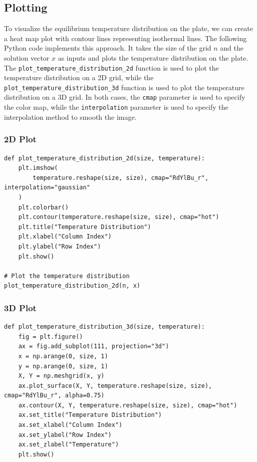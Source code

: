 \documentclass{article}
\begin{document}
\begin{multicols}{2}
\subsection{Plotting}
To visualize the equilibrium temperature distribution on the plate, we can
create a heat map plot with contour lines representing isothermal lines. The
following Python code implements this approach. It takes the size of the grid
$n$ and the solution vector $x$ as inputs and plots the temperature distribution
on the plate. The \texttt{plot\_temperature\_distribution\_2d} function is used
to plot the temperature distribution on a 2D grid, while the
\texttt{plot\_temperature\_distribution\_3d} function is used to plot the
temperature distribution on a 3D grid. In both cases, the \texttt{cmap}
parameter is used to specify the color map, while the \texttt{interpolation}
parameter is used to specify the interpolation method to smooth the image.
\end{multicols}

\subsubsection{2D Plot}
\begin{lstlisting}[style=Python]
def plot_temperature_distribution_2d(size, temperature):
    plt.imshow(
        temperature.reshape(size, size), cmap="RdYlBu_r", interpolation="gaussian"
    )
    plt.colorbar()
    plt.contour(temperature.reshape(size, size), cmap="hot")
    plt.title("Temperature Distribution")
    plt.xlabel("Column Index")
    plt.ylabel("Row Index")
    plt.show()

# Plot the temperature distribution
plot_temperature_distribution_2d(n, x)
\end{lstlisting}

\subsubsection{3D Plot}
\begin{lstlisting}[style=Python]
def plot_temperature_distribution_3d(size, temperature):
    fig = plt.figure()
    ax = fig.add_subplot(111, projection="3d")
    x = np.arange(0, size, 1)
    y = np.arange(0, size, 1)
    X, Y = np.meshgrid(x, y)
    ax.plot_surface(X, Y, temperature.reshape(size, size), cmap="RdYlBu_r", alpha=0.75)
    ax.contour(X, Y, temperature.reshape(size, size), cmap="hot")
    ax.set_title("Temperature Distribution")
    ax.set_xlabel("Column Index")
    ax.set_ylabel("Row Index")
    ax.set_zlabel("Temperature")
    plt.show()
\end{lstlisting}
\end{document}

